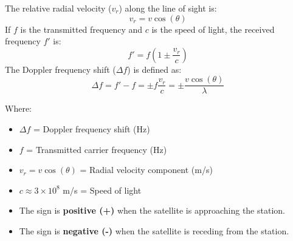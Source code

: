\documentclass[12pt,a4paper]{article}
\begin{document}
\begin{tcolorbox}[tikzbox, title={Doppler Vector Components}]
\centering
{}
\end{tcolorbox}

The relative radial velocity ($v_r$) along the line of sight is:
\begin{equation}
  v_r = v \cos(\theta)
\end{equation}
If $f$ is the transmitted frequency and $c$ is the speed of light, the received frequency $f'$ is:
\begin{equation}
  f' = f \left( 1 \pm \frac{v_r}{c} \right)
\end{equation}
The Doppler frequency shift ($\Delta f$) is defined as:
\begin{equation}
  \Delta f = f' - f = \pm f \frac{v_r}{c} = \pm \frac{v \cos(\theta)}{\lambda}
\end{equation}

Where:
\begin{itemize}[leftmargin=*, itemsep=3pt]
  \item $\Delta f$ = Doppler frequency shift (Hz)
  \item $f$ = Transmitted carrier frequency (Hz)
  \item $v_r = v \cos(\theta)$ = Radial velocity component (m/s)
  \item $c \approx 3 \times 10^8$ m/s = Speed of light
  \item The sign is \textbf{positive (+)} when the satellite is approaching the station.
  \item The sign is \textbf{negative (-)} when the satellite is receding from the station.
\end{itemize}
\end{document}
